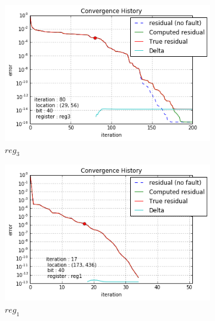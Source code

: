 \begin{figure}[h]
\begin{minipage}[b]{0.48\linewidth}
\begin{subfigure}[t]{\linewidth}
		\includegraphics[width=\linewidth]{figures/gre_216a/convergence_history_register_2.png}
		\caption{$reg_3$}\label{fig:gre_216a_conv_hist_register_2}
	\end{subfigure}
    \end{minipage}
    \quad
    \begin{minipage}[b]{0.48\linewidth}
    	\begin{subfigure}[t]{\linewidth}
		\centering
		\includegraphics[width=\linewidth]{figures/pores_2/convergence_history_register_0.png}
		\caption{$reg_1$}\label{fig:pores_2_conv_hist_register_0}		
	\end{subfigure}
	\quad
	\begin{subfigure}[t]{\linewidth}
		\centering

\end{subfigure}
\end{minipage}
\end{figure}
